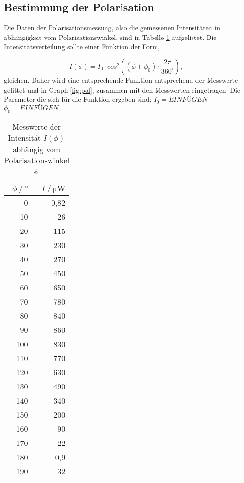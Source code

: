 \subsection{Bestimmung der Polarisation}
\label{sec:estimmung der Polarisation}
Die Daten der Polarisationsmessung, also die gemessenen Intensitäten in abhängigkeit vom Polarisationswinkel, sind in Tabelle \ref{tab:pol} aufgelistet.
Die Intensitätsverteilung sollte einer Funktion der Form,

\begin{equation}
\label{equ:}
  I(\phi) = I_0 \cdot cos^2((\phi + \phi_0) \cdot \frac{2 \pi}{360^{\circ}}),
\end{equation}
gleichen.
Daher wird eine entsprechende Funktion entsprechend der Messwerte gefittet und in Graph \ref{fig:pol}, zusammen mit den Messwerten eingetragen.
Die Parameter die sich für die Funktion ergeben sind:
$I_0 = EINFÜGEN$
$\phi_0 = EINFÜGEN$


\begin{table}[H]
  \centering
  \footnotesize
  \caption{Messwerte der Intensität $I(\phi)$ abhängig vom Polarisationswinkel $\phi$.}
  \label{tab:pol}
  \begin{tabular}{r r}
  \toprule
  $\phi \;/\; \si{\degree}$ & $I \;/\; \si{\micro\watt}$ \\
  \midrule
    0   & 0,82 \\
    10  & 26   \\ 
    20  & 115  \\
    30  & 230  \\
    40  & 270  \\
    50  & 450  \\
    60  & 650  \\
    70  & 780  \\
    80  & 840  \\
    90  & 860  \\
    100 & 830  \\
    110 & 770  \\
    120 & 630  \\
    130 & 490  \\
    140 & 340  \\
    150 & 200  \\
    160 & 90   \\
    170 & 22   \\
    180 & 0,9  \\
    190 & 32   \\
  \bottomrule
  \end{tabular}
\end{table}


